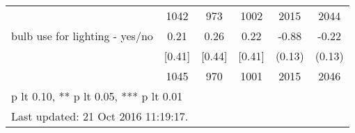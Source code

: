 \begin{table}[htbp]
\begin{tabular*}{0.9\hsize}{@{\hskip\tabcolsep\extracolsep\fill}l*{1}{ccccc}}
                                &     1042&      973&     1002&     2015         &     2044         \\
bulb use for lighting  - yes/no &     0.21&     0.26&     0.22&    -0.88\sym{***}&    -0.22\sym{*}  \\
                                &   [0.41]&   [0.44]&   [0.41]&   (0.13)         &   (0.13)         \\
                                &     1045&      970&     1001&     2015         &     2046         \\
\bottomrule
\multicolumn{6}{l}{\footnotesize * p lt 0.10, ** p lt 0.05, *** p lt 0.01}\\
\multicolumn{6}{l}{\footnotesize Last updated: 21 Oct 2016 11:19:17.}\\
\end{tabular*}
\end{table}
